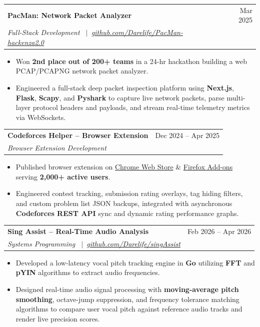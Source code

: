 \documentclass[10pt,letterpaper]{article}
\makeatletter
\newcommand{\resumeSubheading}[4]{
  \vspace{1.5pt}
  \noindent
  \begin{tabularx}{\linewidth}{@{}X r@{}}
    \textbf{#1} & #2 \\
    \textit{\small#3} & \textit{\small#4} \\
  \end{tabularx}\vspace{-1.5pt}
}
\makeatother
\begin{document}
\resumeSubheading
    {PacMan: Network Packet Analyzer}{Mar 2025}
    {Full-Stack Development \ $\vert$\ \href{https://github.com/Darelife/PacMan-hackenza2.0}{github.com/Darelife/PacMan-hackenza2.0}}{}
\begin{itemize}
    \vspace{1pt}
    \item Won \textbf{2nd place out of 200+ teams} in a 24-hr hackathon building a web PCAP/PCAPNG network packet analyzer.
    \item Engineered a full-stack deep packet inspection platform using \textbf{Next.js}, \textbf{Flask}, \textbf{Scapy}, and \textbf{Pyshark} to capture live network packets, parse multi-layer protocol headers and payloads, and stream real-time telemetry metrics via WebSockets.
\end{itemize}

\vspace{2pt}
\resumeSubheading
    {Codeforces Helper -- Browser Extension}{Dec 2024 -- Apr 2025}
    {Browser Extension Development}{}
\begin{itemize}
    \vspace{1pt}
    \item Published browser extension on \href{https://chromewebstore.google.com/detail/codeforces-helper/ahoeafmlmoohkkalcickdnkifpfnolpj}{Chrome Web Store} \& \href{https://addons.mozilla.org/en-US/firefox/addon/codeforces-helper/}{Firefox Add-ons} serving \textbf{2,000+ active users}.
    \item Engineered contest tracking, submission rating overlays, tag hiding filters, and custom problem list JSON backups, integrated with asynchronous \textbf{Codeforces REST API} sync and dynamic rating performance graphs.
\end{itemize}

\vspace{2pt}
\resumeSubheading
    {Sing Assist -- Real-Time Audio Analysis}{Feb 2026 -- Apr 2026}
    {Systems Programming \ $\vert$\ \href{https://github.com/darelife/singAssist}{github.com/Darelife/singAssist}}{}
\begin{itemize}
    \vspace{1pt}
    \item Developed a low-latency vocal pitch tracking engine in \textbf{Go} utilizing \textbf{FFT} and \textbf{pYIN} algorithms to extract audio frequencies.
    \item Designed real-time audio signal processing with \textbf{moving-average pitch smoothing}, octave-jump suppression, and frequency tolerance matching algorithms to compare user vocal pitch against reference audio tracks and render live precision scores.
\end{itemize}
\end{document}
